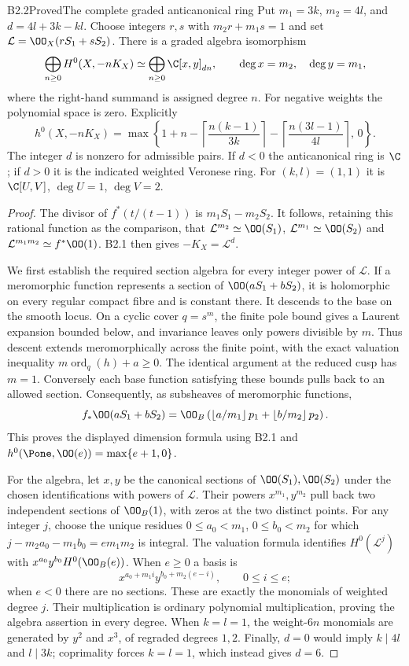 \begin{claim}{B2.2}{Proved}{The complete graded anticanonical ring}
Put $m_1=3k$, $m_2=4l$, and $d=4l+3k-kl$.
Choose integers $r,s$ with $m_2r+m_1s=1$ and set
$\mathcal L=\OO_X(rS_1+sS_2)$.
There is a graded algebra isomorphism
\[
\bigoplus_{n\ge0}H^0(X,-nK_X)
\simeq\bigoplus_{n\ge0}\C[x,y]_{dn},
\qquad\deg x=m_2,\quad\deg y=m_1,
\]
where the right-hand summand is assigned degree $n$.
For negative weights the polynomial space is zero. Explicitly
\[
h^0(X,-nK_X)=
\max\left\{1+n-\left\lceil\frac{n(k-1)}{3k}\right\rceil
-\left\lceil\frac{n(3l-1)}{4l}\right\rceil,\,0\right\}.
\]
The integer $d$ is nonzero for admissible pairs. If $d<0$ the
anticanonical ring is $\C$; if $d>0$ it is the indicated weighted
Veronese ring. For $(k,l)=(1,1)$ it is
$\C[U,V]$, $\deg U=1$, $\deg V=2$.
\end{claim}
\begin{proof}
The divisor of $f^*(t/(t-1))$ is $m_1S_1-m_2S_2$.
It follows, retaining this rational function as the comparison, that
$\mathcal L^{m_2}\simeq\OO(S_1)$,
$\mathcal L^{m_1}\simeq\OO(S_2)$ and
$\mathcal L^{m_1m_2}\simeq f^*\OO(1)$.
B2.1 then gives $-K_X=\mathcal L^d$.

We first establish the required section algebra for every integer
power of $\mathcal L$. If a meromorphic function represents a section
of $\OO(aS_1+bS_2)$, it is holomorphic on every regular compact fibre
and is constant there. It descends to the base on the smooth locus.
On a cyclic cover $q=s^m$, the finite pole bound gives a Laurent
expansion bounded below, and invariance leaves only powers divisible
by $m$. Thus descent extends meromorphically across the finite point,
with the exact valuation inequality $m\operatorname{ord}_q(h)+a\ge0$.
The identical argument at the reduced cusp has $m=1$.
Conversely each base function satisfying these bounds pulls back to
an allowed section. Consequently, as subsheaves of meromorphic functions,
\[
f_*\OO(aS_1+bS_2)=
\OO_B\left(\left\lfloor a/m_1\right\rfloor p_1+
\left\lfloor b/m_2\right\rfloor p_2\right).
\]
This proves the displayed dimension formula using B2.1 and
$h^0(\Pone,\OO(e))=\max\{e+1,0\}$.

For the algebra, let $x,y$ be the canonical sections of
$\OO(S_1),\OO(S_2)$ under the chosen identifications with powers of
$\mathcal L$. Their powers $x^{m_1},y^{m_2}$ pull back two independent
sections of $\OO_B(1)$, with zeros at the two distinct points.
For any integer $j$, choose the unique residues
$0\le a_0<m_1$, $0\le b_0<m_2$ for which
$j-m_2a_0-m_1b_0=e m_1m_2$ is integral.
The valuation formula identifies $H^0(\mathcal L^j)$ with
$x^{a_0}y^{b_0}H^0(\OO_B(e))$. When $e\ge0$ a basis is
\[
x^{a_0+m_1i}y^{b_0+m_2(e-i)},\qquad0\le i\le e;
\]
when $e<0$ there are no sections. These are exactly the monomials of
weighted degree $j$. Their multiplication is ordinary polynomial
multiplication, proving the algebra assertion in every degree.
When $k=l=1$, the weight-$6n$ monomials are generated by $y^2$ and
$x^3$, of regraded degrees $1,2$.
Finally, $d=0$ would imply $k\mid4l$ and $l\mid3k$; coprimality
forces $k=l=1$, which instead gives $d=6$.
\end{proof}
